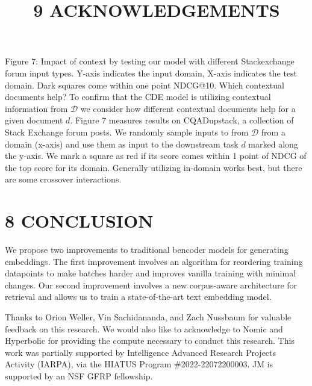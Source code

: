Figure 7: Impact of context by testing our model with different Stackexchange forum input types. Y-axis indicates the input domain, X-axis indicates the test domain. Dark squares come within one point NDCG@10.
Which contextual documents help? To confirm that the CDE model is utilizing contextual information from \(\mathcal{D}\) we consider how different contextual documents help for a given document \(d\). Figure 7 measures results on CQADupstack, a collection of Stack Exchange forum posts. We randomly sample inputs to from \(\mathcal{D}\) from a domain (x-axis) and use them as input to the downstream task \(d\) marked along the y-axis. We mark a square as red if its score comes within 1 point of NDCG of the top score for its domain. Generally utilizing in-domain works best, but there are some crossover interactions.
\section*{8 CONCLUSION}
We propose two improvements to traditional bencoder models for generating embeddings. The first improvement involves an algorithm for reordering training datapoints to make batches harder and improves vanilla training with minimal changes. Our second improvement involves a new corpus-aware architecture for retrieval and allows us to train a state-of-the-art text embedding model.

\title{
9 ACKNOWLEDGEMENTS
}
Thanks to Orion Weller, Vin Sachidananda, and Zach Nussbaum for valuable feedback on this research. We would also like to acknowledge to Nomic and Hyperbolic for providing the compute necessary to conduct this research. This work was partially supported by Intelligence Advanced Research Projects Activity (IARPA), via the HIATUS Program \#2022-22072200003. JM is supported by an NSF GFRP fellowship.

